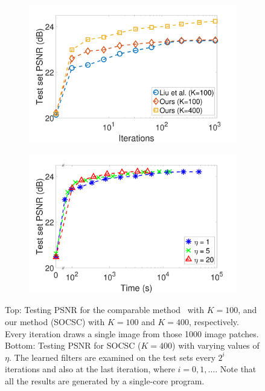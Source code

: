 \begin{figure}[h]
\centering
\begin{subfigure}{0.45\textwidth}
  \includegraphics[width=1\linewidth]{figure/overComplete-ite.pdf}
\end{subfigure}
\begin{subfigure}{0.45\textwidth}
  \includegraphics[width=1\linewidth]{figure/minibatch.pdf}
\end{subfigure}

\caption{Top: Testing PSNR for the comparable method~\cite{liu-2018-first} with $K=100$, and our method (SOCSC) with $K=100$ and $K=400$, respectively. Every iteration draws a single image from those 1000 image patches. Bottom: Testing PSNR for SOCSC ($K=400$) with varying values of $\eta$. The learned filters are examined on the test sets every $2^i$ iterations and also at the last iteration, where $i=0,1,\dots$. Note that all the results are generated by a single-core program.}
\label{fig:overComDicAndMinibatch}
\end{figure}

